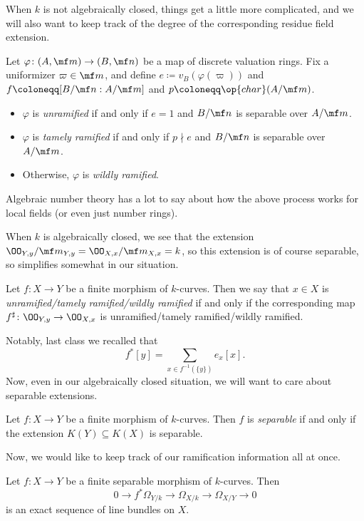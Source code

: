 \documentclass[../notes.tex]{subfiles}
\begin{document}
When $k$ is not algebraically closed, things get a little more complicated, and we will also want to keep track of the degree of the corresponding residue field extension.
\begin{definition}[ramification] \label{defi:gen-ramification}
	Let $\varphi\colon(A,\mf m)\to(B,\mf n)$ be a map of discrete valuation rings. Fix a uniformizer $\varpi\in\mf m$, and define $e\coloneqq v_B(\varphi(\varpi))$ and $f\coloneqq[B/\mf n:A/\mf m]$ and $p\coloneqq\op{char}(A/\mf m)$.
	\begin{itemize}
		\item $\varphi$ is \textit{unramified} if and only if $e=1$ and $B/\mf n$ is separable over $A/\mf m$.
		\item $\varphi$ is \textit{tamely ramified} if and only if $p\nmid e$ and $B/\mf n$ is separable over $A/\mf m$.
		\item Otherwise, $\varphi$ is \textit{wildly ramified}.
	\end{itemize}
\end{definition}
\begin{remark}
	Algebraic number theory has a lot to say about how the above process works for local fields (or even just number rings).
\end{remark}
When $k$ is algebraically closed, we see that the extension $\OO_{Y,y}/\mf m_{Y,y}=\OO_{X,x}/\mf m_{X,x}=k$, so this extension is of course separable, so  simplifies somewhat in our situation.
\begin{definition}
	Let $f\colon X\to Y$ be a finite morphism of $k$-curves. Then we say that $x\in X$ is \textit{unramified/tamely ramified/wildly ramified} if and only if the corresponding map $f^\sharp\colon\OO_{Y,y}\to\OO_{X,x}$ is unramified/tamely ramified/wildly ramified.
\end{definition}
Notably, last class we recalled that
\[f^*[y]=\sum_{x\in f^{-1}(\{y\})}e_x[x].\]
Now, even in our algebraically closed situation, we will want to care about separable extensions.
\begin{definition}[separable]
	Let $f\colon X\to Y$ be a finite morphism of $k$-curves. Then $f$ is \textit{separable} if and only if the extension $K(Y)\subseteq K(X)$ is separable.
\end{definition}
Now, we would like to keep track of our ramification information all at once.
\begin{lemma}
	Let $f\colon X\to Y$ be a finite separable morphism of $k$-curves. Then
	\[0\to f^*\Omega_{Y/k}\to\Omega_{X/k}\to\Omega_{X/Y}\to0\]
	is an exact sequence of line bundles on $X$.\todo{}
\end{lemma}
\end{document}
